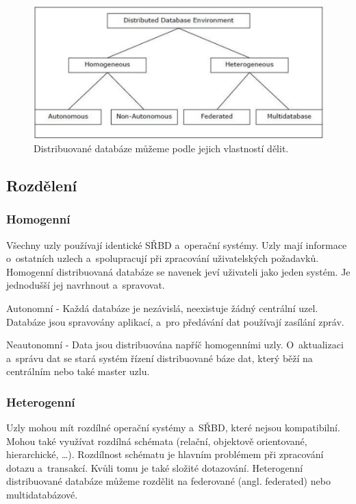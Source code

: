 \begin{figure}[!h]
  \centering
  \includegraphics[width=14cm]{template-fig/distributed_database_environments.pdf}
  \caption{Distribuované databáze můžeme podle jejich vlastností dělit. \cite{distributedDBMS}}
  \label{FIG_DivDistrDB}
\end{figure}

\subsection{Rozdělení}
\subsubsection{Homogenní}
Všechny uzly používají identické SŘBD a~operační systémy. Uzly mají informace o~ostatních uzlech a~spolupracují při zpracování uživatelských požadavků. Homogenní distribuovaná databáze se navenek jeví uživateli jako jeden systém. Je jednodušší jej navrhnout a~spravovat.

\vspace{0.5cm}
\noindent Autonomní - Každá databáze je nezávislá, neexistuje žádný centrální uzel. Databáze jsou spravovány aplikací, a~pro předávání dat používají zasílání zpráv.

\vspace{0.5cm}
\noindent Neautonomní - Data jsou distribuována napříč homogenními uzly. O~aktualizaci a~správu dat se stará systém řízení distribuované báze dat, který běží na centrálním nebo také master uzlu.

\subsubsection{Heterogenní}
Uzly mohou mít rozdílné operační systémy a~SŘBD, které nejsou kompatibilní. Mohou také využívat rozdílná schémata (relační, objektově orientované, hierarchické, \ldots). Rozdílnost schématu je hlavním problémem při zpracování dotazu a~transakcí. Kvůli tomu je také složité dotazování. \cite{wikiDBMS} Heterogenní distribuované databáze můžeme rozdělit na federované (angl. federated) nebo multidatabázové.

